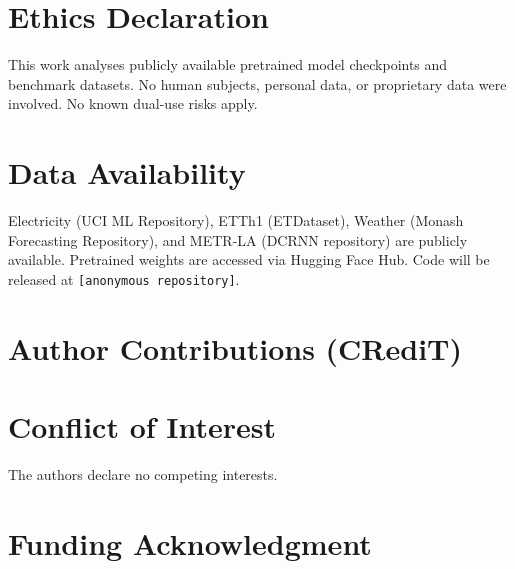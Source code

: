\documentclass[letterpaper,twocolumn]{article}
\begin{document}
\section*{Ethics Declaration}
This work analyses publicly available pretrained model checkpoints and
benchmark datasets.
No human subjects, personal data, or proprietary data were involved.
No known dual-use risks apply.

\section*{Data Availability}
Electricity (UCI ML Repository), ETTh1 (ETDataset), Weather (Monash
Forecasting Repository), and METR-LA (DCRNN repository) are publicly available.
Pretrained weights are accessed via Hugging Face Hub.
Code will be released at \texttt{[anonymous repository]}.

\section*{Author Contributions (CRediT)}

\section*{Conflict of Interest}
The authors declare no competing interests.

\section*{Funding Acknowledgment}



\end{document}
